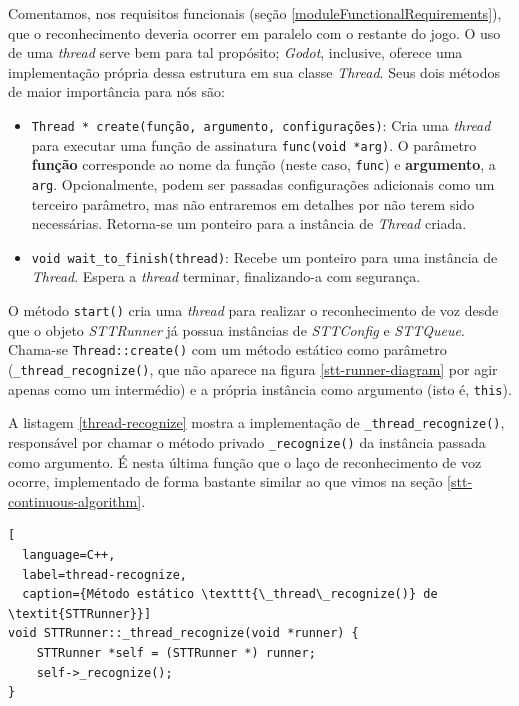Comentamos, nos requisitos funcionais (seção \ref{moduleFunctionalRequirements}), que o reconhecimento deveria ocorrer em paralelo com o restante do jogo. O uso de uma \textit{thread} serve bem para tal propósito; \textit{Godot}, inclusive, oferece uma implementação própria dessa estrutura em sua classe \textit{Thread}. Seus dois métodos de maior importância para nós são:

\begin{itemize}
\item \texttt{Thread * create(função, argumento, configurações)}: Cria uma \textit{thread} para executar uma função de assinatura \texttt{func(void *arg)}. O parâmetro \textbf{função} corresponde ao nome da função (neste caso, \texttt{func}) e \textbf{argumento}, a \texttt{arg}. Opcionalmente, podem ser passadas configurações adicionais como um terceiro parâmetro, mas não entraremos em detalhes por não terem sido necessárias. Retorna-se um ponteiro para a instância de \textit{Thread} criada.

\item \texttt{void wait\_to\_finish(thread)}: Recebe um ponteiro para uma instância de \textit{Thread}. Espera a \textit{thread} terminar, finalizando-a com segurança.
\end{itemize}

O método \texttt{start()} cria uma \textit{thread} para realizar o reconhecimento de voz desde que o objeto \textit{STTRunner} já possua instâncias de \textit{STTConfig} e \textit{STTQueue}. Chama-se \texttt{Thread::create()} com um método estático como parâmetro (\texttt{\_thread\_recognize()}, que não aparece na figura \ref{stt-runner-diagram} por agir apenas como um intermédio) e a própria instância como argumento (isto é, \texttt{this}).

A listagem \ref{thread-recognize} mostra a implementação de \texttt{\_thread\_recognize()}, responsável por chamar o método privado \texttt{\_recognize()} da instância passada como argumento. É nesta última função que o laço de reconhecimento de voz ocorre, implementado de forma bastante similar ao que vimos na seção \ref{stt-continuous-algorithm}.

\begin{lstlisting}[
  language=C++,
  label=thread-recognize,
  caption={Método estático \texttt{\_thread\_recognize()} de \textit{STTRunner}}]
void STTRunner::_thread_recognize(void *runner) {
    STTRunner *self = (STTRunner *) runner;
    self->_recognize();
}
\end{lstlisting}

